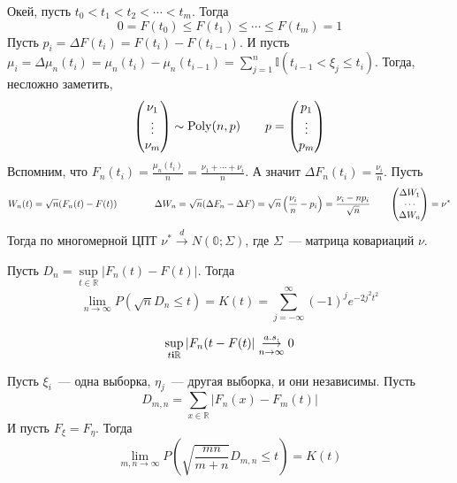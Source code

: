 \documentclass{article}
\begin{document}
    \begin{discourse}
        Окей, пусть $t_0<t_1<t_2<\cdots<t_m$. Тогда
        \[
        0=F(t_0)\leqslant F(t_1)\leqslant\cdots\leqslant F(t_m)=1
        \]
        Пусть $p_i=\Delta F(t_i)=F(t_i)-F(t_{i-1})$. И пусть $\mu_i=\Delta\mu_n(t_i)=\mu_n(t_i)-\mu_n(t_{i-1})=\sum\limits_{j=1}^{n}\mathbb I(t_{i-1}<\xi_j\leqslant t_i)$.
        Тогда, несложно заметить,
        \[
        \left(\begin{matrix}\nu_1\\\vdots\\\nu_m\end{matrix}\right)\sim\operatorname{Poly}(n,p)\qquad p=\left(\begin{matrix}p_1\\\vdots\\p_m\end{matrix}\right)
        \]
        Вспомним, что $F_n(t_i)=\frac{\mu_n(t_i)}n=\frac{\nu_1+\cdots+\nu_i}n$. А значит $\Delta F_n(t_i)=\frac{\nu_i}n$. Пусть
        \[
        W_n(t)=\sqrt n(F_n(t)-F(t))\qquad\qquad\Delta W_n=\sqrt n(\Delta F_n-\Delta F)=\sqrt n\left(\frac{\nu_i}n-p_i\right)=\frac{\nu_i-np_i}{\sqrt n}\qquad\left(\begin{matrix}\Delta W_1\\\cdots\\\Delta W_n\end{matrix}\right)=\nu^*
        \]
        Тогда по многомерной ЦПТ $\nu^*\overset d\rightarrow N(\mathbb0;\Sigma)$, где $\Sigma$~--- матрица ковариаций $\nu$.
    \end{discourse}
    \begin{theorem}
        Пусть $D_n=\sup\limits_{t\in\mathbb R}|F_n(t)-F(t)|$. Тогда
        \[
        \lim\limits_{n\to\infty}P(\sqrt n D_n\leqslant t)=K(t)=\sum\limits_{j=-\infty}^{\infty}(-1)^je^{-2j^2t^2}
        \]
    \end{theorem}
    \begin{theorem}
        \[
        \sup_{t{\mathbf i}\mathbb R}|F_n(t-F(t)|\overset{a.s.}{\underset{n\to\infty}\longrightarrow}0
        \]
    \end{theorem}
    \begin{theorem}
        Пусть $\xi_i$~--- одна выборка, $\eta_j$~--- другая выборка, и они независимы. Пусть
        \[
        D_{m,n}=\sum\limits_{x\in\mathbb R}|F_n(x)-F_m(t)|
        \]
        И пусть $F_\xi=F_\eta$. Тогда
        \[
        \lim\limits_{m,n\to\infty} P\left(\sqrt{\frac{mn}{m+n}}D_{m,n}\leqslant t\right)=K(t)
        \]
    \end{theorem}
\end{document}
